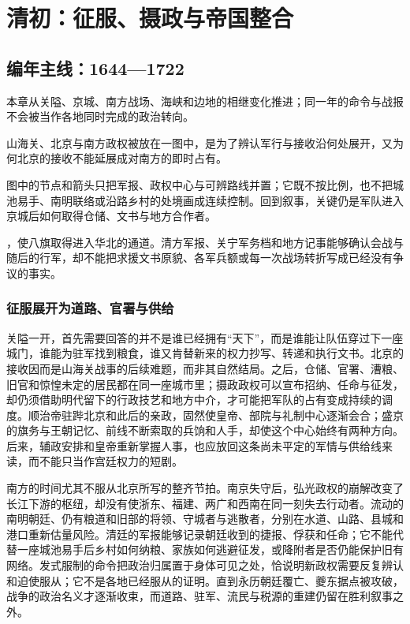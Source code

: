 \chapter{清初：征服、摄政与帝国整合}
\label{ch:early-qing}



\section{编年主线：1644—1722}

本章从关隘、京城、南方战场、海峡和边地的相继变化推进；同一年的命令与战报不会被当作各地同时完成的政治转向。

\noindent 山海关、北京与南方政权被放在一图中，是为了辨认军行与接收沿何处展开，又为何北京的接收不能延展成对南方的即时占有。

图中的节点和箭头只把军报、政权中心与可辨路线并置；它既不按比例，也不把城池易手、南明联络或沿路乡村的处境画成连续控制。回到叙事，关键仍是军队进入京城后如何取得仓储、文书与地方合作者。

\begin{event}
，使八旗取得进入华北的通道。清方军报、关宁军务档和地方记事能够确认会战与随后的行军，却不能把求援文书原貌、各军兵额或每一次战场转折写成已经没有争议的事实。
\end{event}

\subsection*{征服展开为道路、官署与供给}

关隘一开，首先需要回答的并不是谁已经拥有“天下”，而是谁能让队伍穿过下一座城门，谁能为驻军找到粮食，谁又肯替新来的权力抄写、转递和执行文书。北京的接收因而是山海关战事的后续难题，而非其自然结局。之后，仓储、官署、漕粮、旧官和惊惶未定的居民都在同一座城市里；摄政政权可以宣布招纳、任命与征发，却仍须借助明代留下的行政技艺和地方中介，才可能把军队的占有变成持续的调度。顺治帝驻跸北京和此后的亲政，固然使皇帝、部院与礼制中心逐渐会合；盛京的旗务与王朝记忆、前线不断索取的兵饷和人手，却使这个中心始终有两种方向。后来，辅政安排和皇帝重新掌握人事，也应放回这条尚未平定的军情与供给线来读，而不能只当作宫廷权力的短剧。

南方的时间尤其不服从北京所写的整齐节拍。南京失守后，弘光政权的崩解改变了长江下游的枢纽，却没有使浙东、福建、两广和西南在同一刻失去行动者。流动的南明朝廷、仍有粮道和旧部的将领、守城者与逃散者，分别在水道、山路、县城和港口重新估量风险。清廷的军报能够记录朝廷收到的捷报、俘获和任命；它不能代替一座城池易手后乡村如何纳粮、家族如何逃避征发，或降附者是否仍能保护旧有网络。发式服制的命令把政治归属置于身体可见之处，恰说明新政权需要反复辨认和迫使服从；它不是各地已经服从的证明。直到永历朝廷覆亡、夔东据点被攻破，战争的政治名义才逐渐收束，而道路、驻军、流民与税源的重建仍留在胜利叙事之外。

